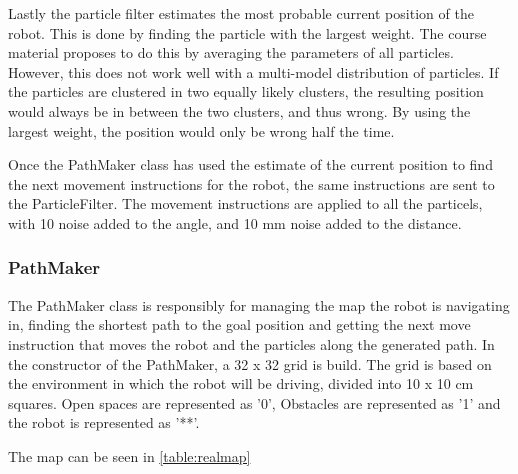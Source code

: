 \documentclass[Main]{subfiles}
\begin{document}
	Lastly the particle filter estimates the most probable current position of the robot. 
	This is done by finding the particle with the largest weight.
	The course material proposes to do this by averaging the parameters of all particles.
	However, this does not work well with a multi-model distribution of particles.
	If the particles are clustered in two equally likely clusters, the resulting position would always be in between the two clusters, and thus wrong.
	By using the largest weight, the position would only be wrong half the time.
	
	Once the PathMaker class has used the estimate of the current position to find the next movement instructions for the robot, the same instructions are sent to the ParticleFilter.
	The movement instructions are applied to all the particels, with 10 \degree noise added to the angle, and 10 mm noise added to the distance.
	
		\subsubsection{PathMaker} %
	\label{subsub:software_pathmaker}
	
	The PathMaker class is responsibly for managing the map the robot is navigating in, finding the shortest path to the goal position and getting the next move instruction that moves the robot and the particles along the generated path.
	In the constructor of the PathMaker, a 32 x 32 grid is build. The grid is based on the environment in which the robot will be driving, divided into 10 x 10 cm squares. 
	Open spaces are represented as '0', Obstacles are represented as '1' and the robot is represented as '**'.
	
	The map can be seen in \autoref{table:realmap}
	
\end{document}
